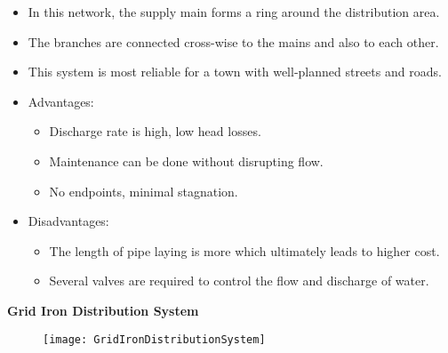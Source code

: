\begin{itemize}
\item In this network, the supply main forms a ring around the distribution area.
\item The branches are connected cross-wise to the mains and also to each other.
\item This system is most reliable for a town with well-planned streets and roads.
\item Advantages:\\
\begin{itemize}
        \item Discharge rate is high, low head losses.
        \item Maintenance can be done without disrupting flow.
        \item No endpoints, minimal stagnation.
\end{itemize}
\item Disadvantages:
\begin{itemize}
        \item The length of pipe laying is more which ultimately leads to higher cost.
        \item Several valves are required to control the flow and discharge of water.
\end{itemize}
\end{itemize}
\vspace{1cm}
\textbf{Grid Iron Distribution System}\\
    \begin{figure}[h!]
        \begin{center}
     \texttt{[image: GridIronDistributionSystem]}\\
     \end{center}
     \end{figure}
